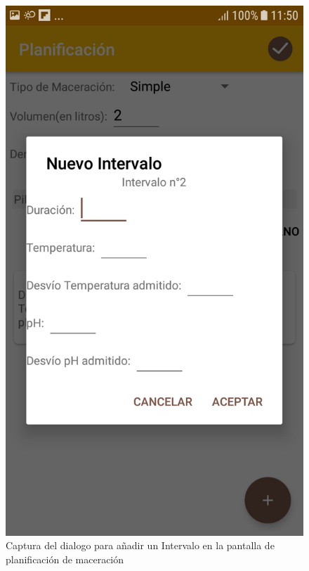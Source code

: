                 \begin{figure}[h]
                    \centering
                    \includegraphics[scale=0.2]{software/ScreenCapture/PlanningActivity-AddInterval.jpg}
                    \caption{Captura del dialogo para añadir un Intervalo en la pantalla de planificación de maceración}
                    \label{fig:CapturaPlanAddInterval}
                \end{figure}
